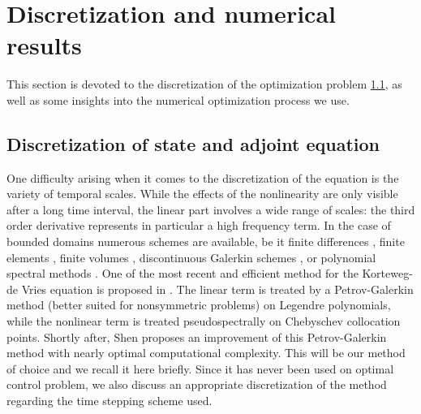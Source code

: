 \section{Discretization and numerical results}
\label{secnum}
This section is devoted to the discretization of the optimization problem \ref{}, as well as some insights into the numerical optimization process we use.
\subsection{Discretization of state and adjoint equation}
One difficulty arising when it comes to the discretization of the \KdVB equation is the variety of temporal scales. While the effects of the nonlinearity are only visible after a long time interval, the linear part involves a wide range of scales: the third order derivative represents in particular a high frequency term. In the case of bounded domains numerous schemes are available, be it finite differences \cite{djidjeli1995numerical,zabusky1965interaction}, finite elements \cite{winther1980conservative,arnold1982superconvergent}, finite volumes \cite{dutykh2013finite}, discontinuous Galerkin schemes \cite{Bona1986859,yan2002local}, or polynomial spectral methods \cite{ma2000legendre,ma2001optimal,shen2003new}. One of the most recent and efficient method for the Korteweg-de Vries equation is proposed in \cite{ma2000legendre}. The linear term is treated by a Petrov-Galerkin method (better suited for nonsymmetric problems) on Legendre polynomials, while the nonlinear term is treated pseudospectrally on Chebyschev collocation points. Shortly after, Shen \cite{shen2003new} proposes an improvement of this Petrov-Galerkin method with nearly optimal computational complexity. This will be our method of choice and we recall it here briefly. Since it has never been used on optimal control problem, we also discuss an appropriate discretization of the method regarding the time stepping scheme used.




